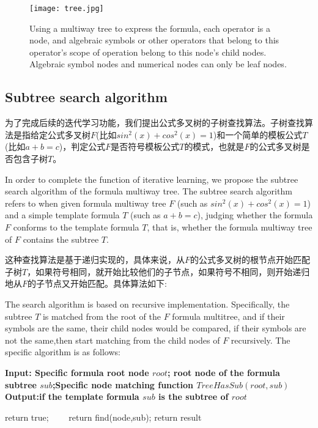 \documentclass[runningheads]{llncs}
\begin{document}
\begin{figure}[H]
\centering
\texttt{[image: tree.jpg]}
\caption{用多叉树表达公式。每一个算符都是节点，属于这个算符运算范围的代数符号或者其他算符属于这个算符的子节点。代数符号节点和数值节点都是叶节点，叶节点也必然是代数符号节点或数值节点。}
\caption{Using a multiway tree to express the formula, each operator is a node, and algebraic symbols or other operators that belong to this operator's scope of operation belong to this node's child nodes. Algebraic symbol nodes and numerical nodes can only be leaf nodes.}
\end{figure}

\subsection{Subtree search algorithm}
为了完成后续的迭代学习功能，我们提出公式多叉树的子树查找算法。子树查找算法是指给定公式多叉树$F$(比如$sin^2(x)+cos^2(x)=1$)和一个简单的模板公式$T$(比如$a+b=c$)，判定公式$F$是否符号模板公式$T$的模式，也就是$F$的公式多叉树是否包含子树$T$。

In order to complete the function of iterative learning, we propose the subtree search algorithm of the formula multiway tree. The subtree search algorithm refers to when given formula multiway tree $F$ (such as $sin^2(x)+cos^2(x)=1$) and a simple template formula $T$ (such as $a+b =c$), judging whether the formula $F$ conforms to the template formula $T$, that is, whether the formula multiway tree of $F$ contains the subtree $T$.

这种查找算法是基于递归实现的，具体来说，从$F$的公式多叉树的根节点开始匹配子树$T$，如果符号相同，就开始比较他们的子节点，如果符号不相同，则开始递归地从$F$的子节点又开始匹配。具体算法如下:

The search algorithm is based on recursive implementation. Specifically, the subtree $T$ is matched from the root of the $F$ formula multitree, and if their symbols are the same, their child nodes would be compared, if their symbols are not the same,then start matching from the child nodes of $F$ recursively. The specific algorithm is as follows:

\begin{algorithm}[t]
\caption{subtree search algorithm $find(root,sub)$} %
\hspace*{0.02in} {\bf Input: Specific formula root node $root$; root node of the formula subtree $sub$;Specific node matching function $TreeHasSub(root,sub)$} 
\hspace*{0.02in} {\bf Output:if the template formula $sub$ is the subtree of $root$} 
\begin{algorithmic}[1]
        return true;
    \EndIf
\EndIf
{} %
　　\State return find(node,sub);
\EndFor
\State return result
\end{algorithmic}
\end{algorithm}
\end{document}
